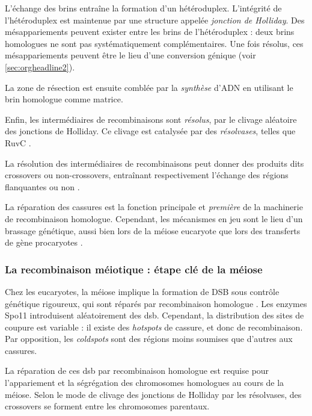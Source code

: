 \documentclass[11pt, oneside]{scrartcl}
\begin{document}
L'échange des brins entraîne la formation d'un hétéroduplex. L'intégrité de
l'hétéroduplex est maintenue par une structure appelée \emph{jonction de Holliday}.
Des mésappariements peuvent exister entre les brins de l'hétéroduplex : deux
brins homologues ne sont pas systématiquement complémentaires. Une fois résolus,
ces mésappariements peuvent être le lieu d'une conversion génique (voir
\ref{sec:orgheadline2}).

La zone de résection est ensuite comblée par la \emph{synthèse} d'ADN en utilisant le
brin homologue comme matrice. 

Enfin, les intermédiaires de recombinaisons sont \emph{résolus}, par le clivage
aléatoire des jonctions de Holliday. Ce clivage est catalysée par des
\emph{résolvases}, telles que RuvC \cite{gorecka_crystal_2013}. 

La résolution des intermédiaires de recombinaisons peut donner des produits dits
crossovers ou non-crossovers, entraînant respectivement l'échange des régions
flanquantes ou non \cite{mancera_high-resolution_2008}.

\begin{transition}
La réparation des cassures est la fonction principale et \emph{première} de la
machinerie de recombinaison homologue. Cependant, les mécanismes en jeu sont le
lieu d'un brassage génétique, aussi bien lors de la méiose eucaryote que lors
des transferts de gène procaryotes \cite{redfield_bacteria_2001}.
\end{transition}

\subsubsection{La recombinaison méiotique : étape clé de la méiose}
\label{sec:orgheadline4}

Chez les eucaryotes, la méiose implique la formation de DSB sous contrôle
génétique rigoureux, qui sont réparés par recombinaison homologue
\cite{chapman_playing_2012}. Les enzymes Spo11 introduisent aléatoirement des
\ac{dsb}. Cependant, la distribution des sites de coupure est variable : il
existe des \emph{hotspots} de cassure, et donc de recombinaison. Par opposition, les
\emph{coldspots} sont des régions moins soumises que d'autres aux cassures.

La réparation de ces \ac{dsb} par recombinaison homologue est requise pour
l'appariement et la ségrégation des chromosomes homologues au cours de la
méiose. Selon le mode de clivage des jonctions de Holliday par les résolvases,
des crossovers se forment entre les chromosomes parentaux. 
\end{document}
